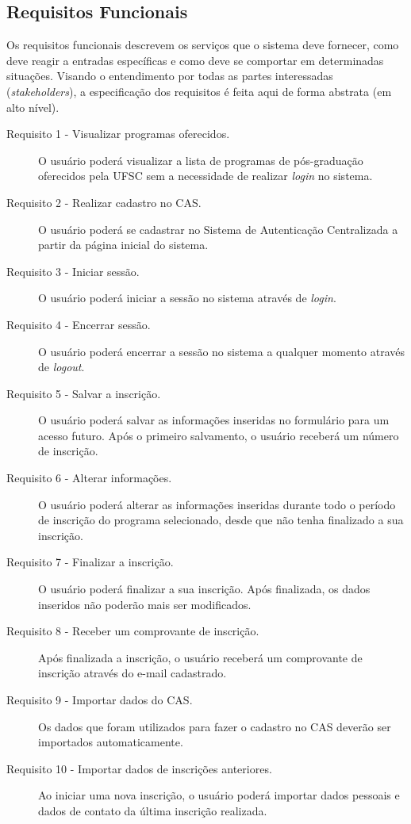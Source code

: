 \documentclass[
  10.5pt,				  %
	openright,			%
	twoside,			  %
  a5paper,
  chapter=TITLE,	%
	section=TITLE,	%
  hyphens,        %
	english,        %
	brazil          %
]{abntex2}
\begin{document}
\subsection{Requisitos Funcionais}\label{sec:requisitos_funcionais}

Os requisitos funcionais descrevem os serviços que o sistema deve fornecer, como deve reagir a entradas específicas e como deve se comportar em determinadas situações. Visando o entendimento por todas as partes interessadas (\emph{stakeholders}), a especificação dos requisitos é feita aqui de forma abstrata (em alto nível).

\begin{description}
\item[Requisito 1 - Visualizar programas oferecidos.] O usuário poderá visualizar a lista de programas de pós-graduação oferecidos pela UFSC sem a necessidade de realizar \emph{login} no sistema.
\item[Requisito 2 - Realizar cadastro no CAS.] O usuário poderá se cadastrar no Sistema de Autenticação Centralizada a partir da página inicial do sistema.
\item[Requisito 3 - Iniciar sessão.] O usuário poderá iniciar a sessão no sistema através de \emph{login}.
\item[Requisito 4 - Encerrar sessão.] O usuário poderá encerrar a sessão no sistema a qualquer momento através de \emph{logout}.
\item[Requisito 5 - Salvar a inscrição.] O usuário poderá salvar as informações inseridas no formulário para um acesso futuro. Após o primeiro salvamento, o usuário receberá um número de inscrição.
\item[Requisito 6 - Alterar informações.] O usuário poderá alterar as informações inseridas durante todo o período de inscrição do programa selecionado, desde que não tenha finalizado a sua inscrição.
\item[Requisito 7 - Finalizar a inscrição.] O usuário poderá finalizar a sua inscrição. Após finalizada, os dados inseridos não poderão mais ser modificados.
\item[Requisito 8 - Receber um comprovante de inscrição.] Após finalizada a inscrição, o usuário receberá um comprovante de inscrição através do e-mail cadastrado.
\item[Requisito 9 - Importar dados do CAS.] Os dados que foram utilizados para fazer o cadastro no CAS deverão ser importados automaticamente.
\item[Requisito 10 - Importar dados de inscrições anteriores.] Ao iniciar uma nova inscrição, o usuário poderá importar dados pessoais e dados de contato da última inscrição realizada.

\end{description}
\end{document}
